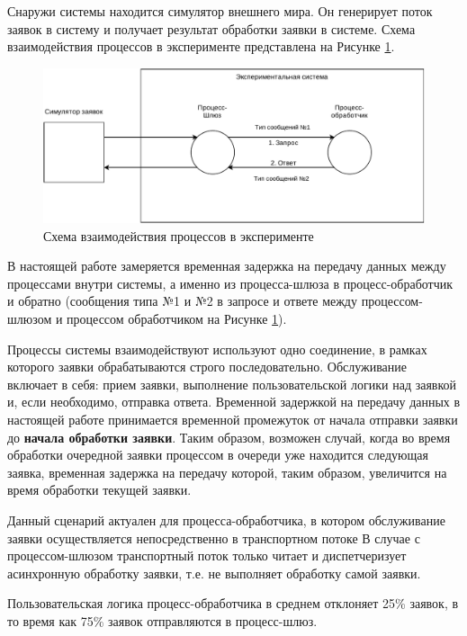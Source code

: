 Снаружи системы находится симулятор внешнего мира. Он генерирует поток заявок в систему и получает результат обработки заявки в системе. Схема взаимодействия процессов в эксперименте представлена на Рисунке \ref{chapter41:SystemSchema}.

\begin{figure}[!h]
\caption{Схема взаимодействия процессов в эксперименте}
\label{chapter41:SystemSchema}
\includegraphics[width=\textwidth]{../../graphics/schemes/SystemSchema}
\end{figure}

В настоящей работе замеряется временная задержка на передачу данных между процессами внутри системы, а именно из процесса-шлюза в процесс-обработчик и обратно (сообщения типа №1 и №2 в запросе и ответе между процессом-шлюзом и процессом обработчиком на Рисунке \ref{chapter41:SystemSchema}).

Процессы системы взаимодействуют используют одно соединение, в рамках которого заявки обрабатываются строго последовательно.
Обслуживание включает в себя: прием заявки, выполнение пользовательской логики над заявкой и, если необходимо, отправка ответа.
Временной задержкой на передачу данных в настоящей работе принимается временной промежуток от начала отправки заявки до \textbf{начала обработки заявки}. Таким образом, возможен случай, когда во время обработки очередной заявки процессом в очереди уже находится следующая заявка, временная задержка на передачу которой, таким образом, увеличится на время обработки текущей заявки.

Данный сценарий актуален для процесса-обработчика, в котором обслуживание заявки осуществляется непосредственно в транспортном потоке
В случае с процессом-шлюзом транспортный поток только читает и диспетчеризует асинхронную обработку заявки, т.е. не выполняет обработку самой заявки.

Пользовательская логика процесс-обработчика в среднем отклоняет 25\% заявок, в то время как 75\% заявок отправляются в процесс-шлюз.

